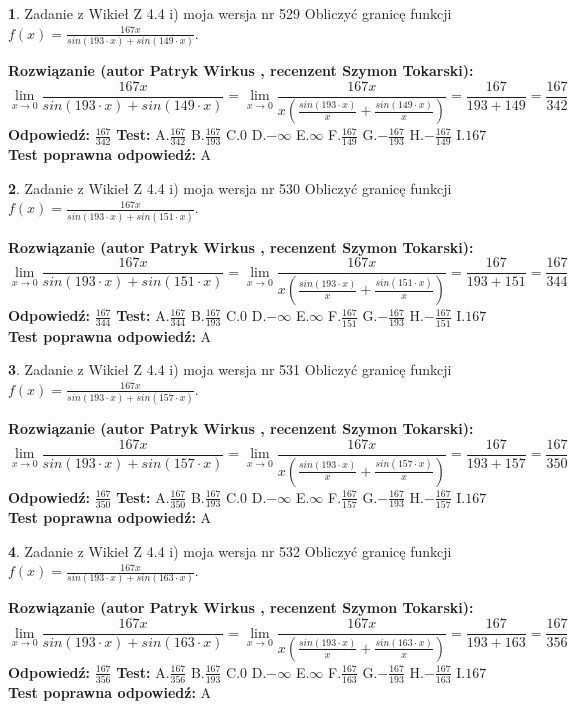 \documentclass[12pt, a4paper]{article}
\theoremstyle{definition} %
\newtheorem{zad}{}
\newcommand{\zadStart}[1]{\begin{zad}#1\newline}
\newcommand{\zadStop}{\end{zad}}
\newcommand{\rozwStart}[2]{\noindent \textbf{Rozwiązanie (autor #1 , recenzent #2): }\newline}
\newcommand{\rozwStop}{\newline}
\newcommand{\odpStart}{\noindent \textbf{Odpowiedź:}\newline}
\newcommand{\odpStop}{\newline}
\newcommand{\testStart}{\noindent \textbf{Test:}\newline}
\newcommand{\testStop}{\newline}
\newcommand{\kluczStart}{\noindent \textbf{Test poprawna odpowiedź:}\newline}
\newcommand{\kluczStop}{\newline}
\begin{document}
\zadStart{Zadanie z Wikieł Z 4.4 i) moja wersja nr 529}
Obliczyć granicę funkcji $f(x)=\frac{167x}{sin(193\cdot x) +sin(149\cdot x)}$.
\zadStop
\rozwStart{Patryk Wirkus}{Szymon Tokarski}
$$\lim\limits_{x\to 0}\frac{167x}{sin(193\cdot x) +sin(149\cdot x)}=\lim\limits_{x\to 0}\frac{167x}{x(\frac{sin(193\cdot x)}{x}+\frac{sin(149\cdot x)}{x})}=\frac{167}{193+149} = \frac{167}{342}$$
\rozwStop
\odpStart
$\frac{167}{342}$
\odpStop
\testStart
A.$\frac{167}{342}$
B.$\frac{167}{193}$
C.$0$
D.$-\infty$
E.$\infty$
F.$\frac{167}{149}$
G.$-\frac{167}{193}$
H.$-\frac{167}{149}$
I.$167$
\testStop
\kluczStart
A
\kluczStop



\zadStart{Zadanie z Wikieł Z 4.4 i) moja wersja nr 530}
Obliczyć granicę funkcji $f(x)=\frac{167x}{sin(193\cdot x) +sin(151\cdot x)}$.
\zadStop
\rozwStart{Patryk Wirkus}{Szymon Tokarski}
$$\lim\limits_{x\to 0}\frac{167x}{sin(193\cdot x) +sin(151\cdot x)}=\lim\limits_{x\to 0}\frac{167x}{x(\frac{sin(193\cdot x)}{x}+\frac{sin(151\cdot x)}{x})}=\frac{167}{193+151} = \frac{167}{344}$$
\rozwStop
\odpStart
$\frac{167}{344}$
\odpStop
\testStart
A.$\frac{167}{344}$
B.$\frac{167}{193}$
C.$0$
D.$-\infty$
E.$\infty$
F.$\frac{167}{151}$
G.$-\frac{167}{193}$
H.$-\frac{167}{151}$
I.$167$
\testStop
\kluczStart
A
\kluczStop



\zadStart{Zadanie z Wikieł Z 4.4 i) moja wersja nr 531}
Obliczyć granicę funkcji $f(x)=\frac{167x}{sin(193\cdot x) +sin(157\cdot x)}$.
\zadStop
\rozwStart{Patryk Wirkus}{Szymon Tokarski}
$$\lim\limits_{x\to 0}\frac{167x}{sin(193\cdot x) +sin(157\cdot x)}=\lim\limits_{x\to 0}\frac{167x}{x(\frac{sin(193\cdot x)}{x}+\frac{sin(157\cdot x)}{x})}=\frac{167}{193+157} = \frac{167}{350}$$
\rozwStop
\odpStart
$\frac{167}{350}$
\odpStop
\testStart
A.$\frac{167}{350}$
B.$\frac{167}{193}$
C.$0$
D.$-\infty$
E.$\infty$
F.$\frac{167}{157}$
G.$-\frac{167}{193}$
H.$-\frac{167}{157}$
I.$167$
\testStop
\kluczStart
A
\kluczStop



\zadStart{Zadanie z Wikieł Z 4.4 i) moja wersja nr 532}
Obliczyć granicę funkcji $f(x)=\frac{167x}{sin(193\cdot x) +sin(163\cdot x)}$.
\zadStop
\rozwStart{Patryk Wirkus}{Szymon Tokarski}
$$\lim\limits_{x\to 0}\frac{167x}{sin(193\cdot x) +sin(163\cdot x)}=\lim\limits_{x\to 0}\frac{167x}{x(\frac{sin(193\cdot x)}{x}+\frac{sin(163\cdot x)}{x})}=\frac{167}{193+163} = \frac{167}{356}$$
\rozwStop
\odpStart
$\frac{167}{356}$
\odpStop
\testStart
A.$\frac{167}{356}$
B.$\frac{167}{193}$
C.$0$
D.$-\infty$
E.$\infty$
F.$\frac{167}{163}$
G.$-\frac{167}{193}$
H.$-\frac{167}{163}$
I.$167$
\testStop
\kluczStart
A
\kluczStop
\end{document}
